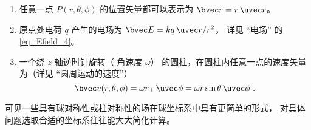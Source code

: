 \begin{example}{}
\begin{enumerate}
\item 任意一点 $P(r, \theta, \phi)$ 的位置矢量都可以表示为 $\bvec r = r\,\uvec r$。
\item 原点处电荷 $q$ 产生的电场为 $\bvec E = k q \,\uvec r/r^2$， 详见 “电场” 的\autoref{eq_Efield_4}。
\item 一个绕 $z$ 轴逆时针旋转（ 角速度 $\omega $） 的圆柱，在圆柱内任意一点的速度矢量为（详见 “圆周运动的速度”）
\begin{equation}
\bvec v(r, \theta, \phi) = \omega r_\bot \,\uvec \phi = \omega r\sin \theta \,\uvec \phi ~.
\end{equation}
\end{enumerate}
可见一些具有球对称性或柱对称性的场在球坐标系中具有更简单的形式， 对具体问题选取合适的坐标系往往能大大简化计算。
\end{example}
